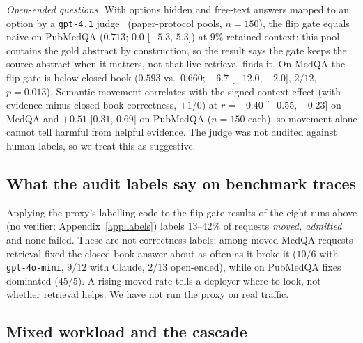 \documentclass[11pt]{article}
\begin{document}
\emph{Open-ended questions.} With options hidden and free-text answers mapped to
an option by a \texttt{gpt-4.1} judge~\citep{llmjudge} (paper-protocol pools,
$n{=}150$), the flip gate equals naive on PubMedQA ($0.713$; $0.0$ [$-5.3$,
$5.3$]) at $9\%$ retained context; this pool contains the gold abstract by
construction, so the result says the gate keeps the source abstract when it
matters, not that live retrieval finds it. On MedQA the flip gate is below
closed-book ($0.593$ vs.\ $0.660$; $-6.7$ [$-12.0$, $-2.0$], $2/12$,
$p{=}0.013$). Semantic movement correlates with the signed context effect
(with-evidence minus closed-book correctness, $\pm1$/$0$) at
$r{=}{-}0.40$ [$-0.55$, $-0.23$] on MedQA and ${+}0.51$ [$0.31$, $0.69$] on
PubMedQA ($n{=}150$ each), so movement alone cannot tell harmful from helpful
evidence. The judge was not audited against human
labels, so we treat this as suggestive.

\subsection{What the audit labels say on benchmark traces}
\label{sec:eval-audit}
Applying the proxy's labelling code to the flip-gate results of the eight runs
above (no verifier; Appendix~\ref{app:labels}) labels $13$--$42\%$ of requests
\emph{moved, admitted} and none failed. These are not correctness labels: among
moved MedQA requests retrieval fixed the closed-book answer about as often as it
broke it ($10$/$6$ with \texttt{gpt-4o-mini}, $9$/$12$ with Claude, $2$/$13$
open-ended), while on PubMedQA fixes dominated ($45$/$5$). A rising moved rate
tells a deployer where to look, not whether retrieval helps. We have not run
the proxy on real traffic.

\subsection{Mixed workload and the cascade}
\label{sec:eval-value}
\end{document}
